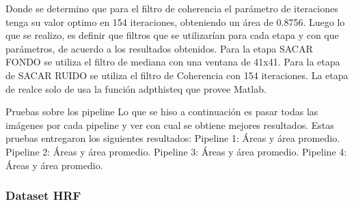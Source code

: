 Donde se determino que para el filtro de coherencia el parámetro de iteraciones tenga su valor optimo en 154 iteraciones, obteniendo un área de 0.8756.
Luego lo que se realizo, es definir que filtros que se utilizarían para cada etapa  y con que parámetros, de acuerdo a los resultados obtenidos. Para la etapa SACAR FONDO se utiliza el filtro de mediana con una ventana de 41x41. Para la etapa de SACAR  RUIDO se utiliza el filtro de Coherencia con 154 iteraciones.  La etapa de realce solo de usa la función adpthisteq que provee Matlab.

Pruebas sobre los pipeline
Lo que se hiso a continuación es pasar todas las imágenes por cada pipeline y ver con cual se obtiene mejores resultados. Estas pruebas entregaron los siguientes resultados:
Pipeline 1: Áreas  y área promedio.
Pipeline 2: Áreas  y área promedio.
Pipeline 3: Áreas  y área promedio.
Pipeline 4: Áreas  y área promedio.



\subsubsection{Dataset HRF}

